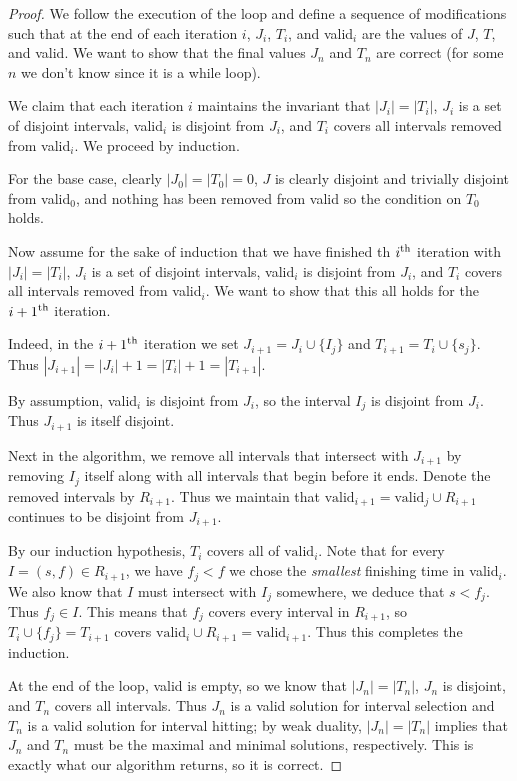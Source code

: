 \documentclass[10pt]{article}
\providecommand{\Kth}[1]{\ensuremath{{#1}^{\rm th}}}
\begin{document}
\begin{enumerate}
\begin{proof}
  We follow the execution of the loop and define a sequence of modifications such that at the end of each iteration \(i\), \(J_i\), \(T_i\), and valid\(_i\) are the values of \(J\), \(T\), and valid. We want to show that the final values \(J_n\) and \(T_n\) are correct (for some \(n\) we don't know since it is a while loop).
  
  We claim that each iteration \(i\) maintains the invariant that \(|J_i| = |T_i|\), \(J_i\) is a set of disjoint intervals, valid\(_i\) is disjoint from \(J_i\), and \(T_i\) covers all intervals removed from valid\(_i\). We proceed by induction.

  For the base case, clearly \(|J_0| = |T_0| = 0\), \(J\) is clearly disjoint and trivially disjoint from valid\(_0\), and nothing has been removed from valid so the condition on \(T_0\) holds. 

  Now assume for the sake of induction that we have finished th \Kth{i} iteration with \(|J_i| = |T_i|\), \(J_i\) is a set of disjoint intervals, valid\(_i\) is disjoint from \(J_i\), and \(T_i\) covers all intervals removed from valid\(_i\). We want to show that this all holds for the \Kth{i + 1} iteration. 

  Indeed, in the \Kth{i + 1} iteration we set \(J_{i + 1} = J_i \cup \{I_{j}\}\) and \(T_{i + 1} = T_i \cup \{s_j\}\). Thus \(|J_{i + 1}| = |J_i| + 1 = |T_i| + 1 = |T_{i + 1}|\). 
  
  By assumption, valid\(_i\) is disjoint from \(J_i\), so the interval \(I_j\) is disjoint from \(J_i\). Thus \(J_{i + 1}\) is itself disjoint. 

  Next in the algorithm, we remove all intervals that intersect with \(J_{i + 1}\) by removing \(I_j\) itself along with all intervals that begin before it ends. Denote the removed intervals by \(R_{i + 1}\). Thus we maintain that \(\text{valid}_{i + 1} = \text{valid}_j \cup R_{i + 1}\) continues to be disjoint from \(J_{i + 1}\).

  By our induction hypothesis, \(T_i\) covers all of \(\text{valid}_i\). Note that for every \(I = (s, f) \in R_{i + 1}\), we have \(f_j < f\) we chose the \textit{smallest} finishing time in valid\(_i\). We also know that \(I\) must intersect with \(I_j\) somewhere, we deduce that \(s < f_j\). Thus \(f_j \in I\). This means that \(f_j\) covers every interval in \(R_{i + 1}\), so \(T_i \cup \{f_j\} = T_{i + 1}\) covers \(\text{valid}_i \cup R_{i + 1} = \text{valid}_{i + 1}\). Thus this completes the induction.

  At the end of the loop, valid is empty, so we know that \(|J_n| = |T_n|\), \(J_n\) is disjoint, and \(T_n\) covers all intervals. Thus \(J_n\) is a valid solution for interval selection and \(T_n\) is a valid solution for interval hitting; by weak duality, \(|J_n| = |T_n|\) implies that \(J_n\) and \(T_n\) must be the maximal and minimal solutions, respectively. This is exactly what our algorithm returns, so it is correct. 
\end{proof}
  
  \end{enumerate}
  
\end{document}
